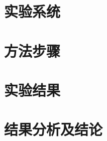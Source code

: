 \documentclass{beamer}
\begin{document}
% 
\section{实验系统}
\section{方法步骤}
\section{实验结果}
\section{结果分析及结论}
\end{document}
